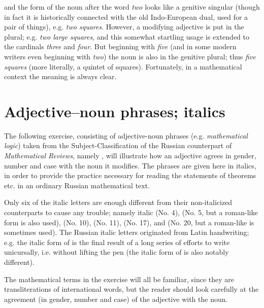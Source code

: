 and the form of the noun after the word \emph{two} looks like a genitive singular (though in fact it is historically connected with the old Indo-European dual, used for a pair of things), e.g.  \emph{two squares}. However, a modifying adjective is put in the plural; e.g.  \emph{two large squares}, and this somewhat startling usage is extended to the cardinals  \emph{three} and  \emph{four}. But beginning with  \emph{five} (and in some modern writers even beginning with  \emph{two}) the noun is also in the genitive plural; thus  \emph{five squares} (more literally, a quintet of squares). Fortunately, in a mathematical context the meaning is always clear.

\section{Adjective--noun phrases; italics}

The following exercise, consisting of adjective-noun phrases (e.g.  \emph{mathematical logic}) taken from the Subject-Classification of the Russian counterpart of \emph{Mathematical Reviews}, namely , will illustrate how an adjective agrees in gender, number and case with the noun it modifies. The phrases are given here in italics, in order to provide the practice necessary for reading the statements of theorems etc. in an ordinary Russian mathematical text.

Only six of the italic letters are enough different from their non-italicized counterparts to cause any trouble; namely italic  (No. 4),  (No. 5, but a roman-like form is also used),  (No. 10),  (No. 11),  (No. 17), and  (No. 20, but a roman-like  is sometimes used). The Russian italic letters originated from Latin handwriting; e.g. the italic form of  is the final result of a long series of efforts to write  unicursally, i.e. without lifting the pen (the italic form of  is also notably different).

The mathematical terms in the exercise will all be familiar, since they are transliterations of international words, but the reader should look carefully at the agreement (in gender, number and case) of the adjective with the noun.

